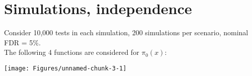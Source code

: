 \documentclass{article}\usepackage[]{graphicx}\usepackage[]{color}
\makeatletter
\def\maxwidth{ %
  \ifdim\Gin@nat@width>\linewidth
    \linewidth
  \else
    \Gin@nat@width
  \fi
}
\newenvironment{knitrout}{}{} %
\makeatother
\begin{document}
\section*{Simulations, independence}

Consider 10,000 tests in each simulation, 200 simulations per scenario, nominal FDR = 5\%.
\\
The following 4 functions are considered for $\pi_0(x)$:
\begin{knitrout}
\color{fgcolor}

{\centering \texttt{[image: Figures/unnamed-chunk-3-1]} 

}



\end{knitrout}

\clearpage
\end{document}
